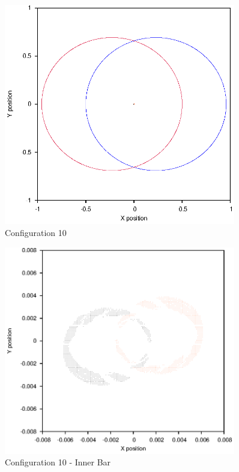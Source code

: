 \documentclass[a4paper,12pt]{article}
\begin{document}
\begin{figure}[H]
\centering
\includegraphics[width=0.9\textwidth]{./results/006-6-006-3/Orbit.eps}
\caption{Configuration 10}
\label{fig:config10}
\end{figure}
\begin{figure}[H]
\centering
\includegraphics[width=0.9\textwidth]{./results/006-6-006-3/Inner.eps}
\caption{Configuration 10 - Inner Bar}
\label{fig:config10i}
\end{figure}
\end{document}
